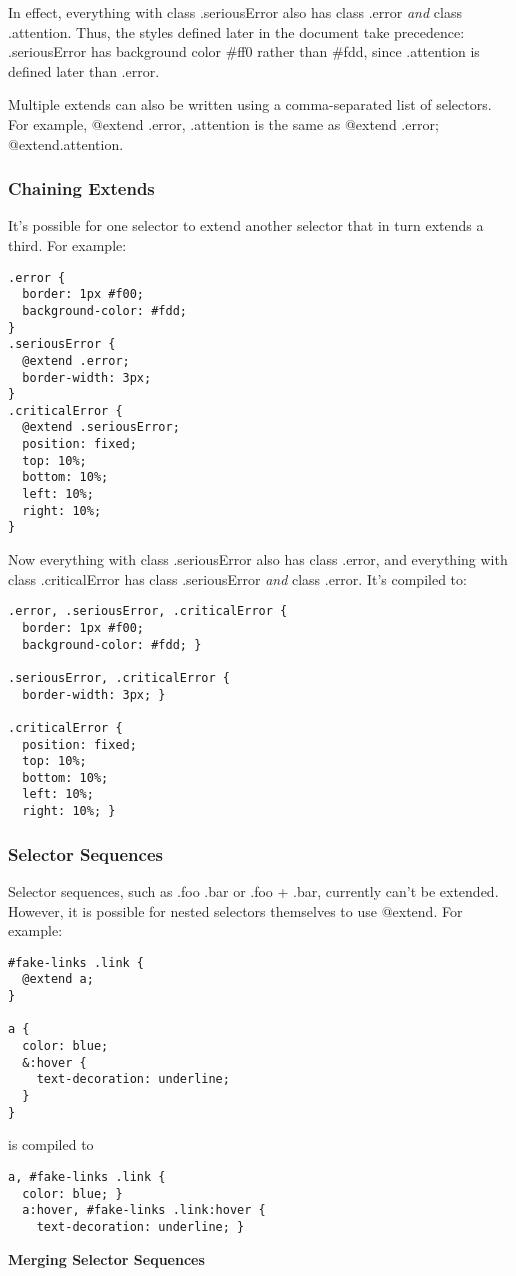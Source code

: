 \documentclass[10pt]{article}
\begin{document}
 In effect, everything with class .seriousError also has class .error \emph{and}
 class .attention. Thus, the styles defined later in the document take precedence: .seriousError has background color \#ff0 rather than \#fdd, since .attention is defined later than .error.


 Multiple extends can also be written using a comma-separated list of selectors. For example, @extend .error, .attention is the same as @extend .error; @extend.attention.
\subsubsection{Chaining Extends}


 It’s possible for one selector to extend another selector that in turn extends a third. For example:
\begin{verbatim}
.error {
  border: 1px #f00;
  background-color: #fdd;
}
.seriousError {
  @extend .error;
  border-width: 3px;
}
.criticalError {
  @extend .seriousError;
  position: fixed;
  top: 10%;
  bottom: 10%;
  left: 10%;
  right: 10%;
}
\end{verbatim}


 Now everything with class .seriousError also has class .error, and everything with class .criticalError has class .seriousError \emph{and}
 class .error. It’s compiled to:
\begin{verbatim}
.error, .seriousError, .criticalError {
  border: 1px #f00;
  background-color: #fdd; }

.seriousError, .criticalError {
  border-width: 3px; }

.criticalError {
  position: fixed;
  top: 10%;
  bottom: 10%;
  left: 10%;
  right: 10%; }
\end{verbatim}
\subsubsection{Selector Sequences}


 Selector sequences, such as .foo .bar or .foo + .bar, currently can’t be extended. However, it is possible for nested selectors themselves to use @extend. For example:
\begin{verbatim}
#fake-links .link {
  @extend a;
}

a {
  color: blue;
  &:hover {
    text-decoration: underline;
  }
}
\end{verbatim}


 is compiled to
\begin{verbatim}
a, #fake-links .link {
  color: blue; }
  a:hover, #fake-links .link:hover {
    text-decoration: underline; }
\end{verbatim}
\textbf{Merging Selector Sequences}
\end{document}
